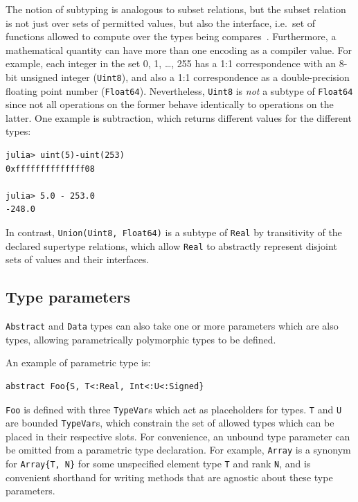 \documentclass[pldi]{sigplanconf-pldi15}
\begin{document}
The notion of subtyping is analogous to subset relations, but the subset
relation is not just over sets of permitted values, but also the interface,
i.e.\ set of functions allowed to compute over the types being
compares~\cite{Scott1976,Liskov1974,Liskov1994}. Furthermore, a mathematical
quantity can have more than one encoding as a compiler value. For example, each
integer in the set {0, 1, \dots, 255} has a 1:1 correspondence with an 8-bit
unsigned integer (\verb|Uint8|), and also a 1:1 correspondence as a
double-precision floating point number (\verb|Float64|). Nevertheless,
\verb|Uint8| is \textit{not} a subtype of \verb|Float64| since not all
operations on the former behave identically to operations on the latter. One
example is subtraction, which returns different values for the different types:

\begin{lstlisting}
julia> uint(5)-uint(253)
0xffffffffffffff08

julia> 5.0 - 253.0
-248.0
\end{lstlisting}
%
In contrast, \verb|Union(Uint8, Float64)| is a subtype of \verb|Real| by
transitivity of the declared supertype relations, which allow \verb|Real|
to abstractly represent disjoint sets of values and their interfaces.


\subsection{Type parameters}
\label{sec:typeparameters}

\verb|Abstract| and \verb|Data| types can also take one or more parameters which
are also types, allowing parametrically polymorphic types to be defined.

An example of parametric type is:

\begin{lstlisting}
abstract Foo{S, T<:Real, Int<:U<:Signed}
\end{lstlisting}
%
\verb|Foo| is defined with three \verb|TypeVar|s which act as placeholders for
types. \verb|T| and \verb|U| are bounded \verb|TypeVar|s, which constrain the
set of allowed types which can be placed in their respective slots. For
convenience, an unbound type parameter can be omitted from a parametric type
declaration. For example, \verb|Array| is a synonym for \verb|Array{T, N}|
for some unspecified element type \verb|T| and rank \verb|N|, and is convenient
shorthand for writing methods that are agnostic about these type parameters.
\end{document}
